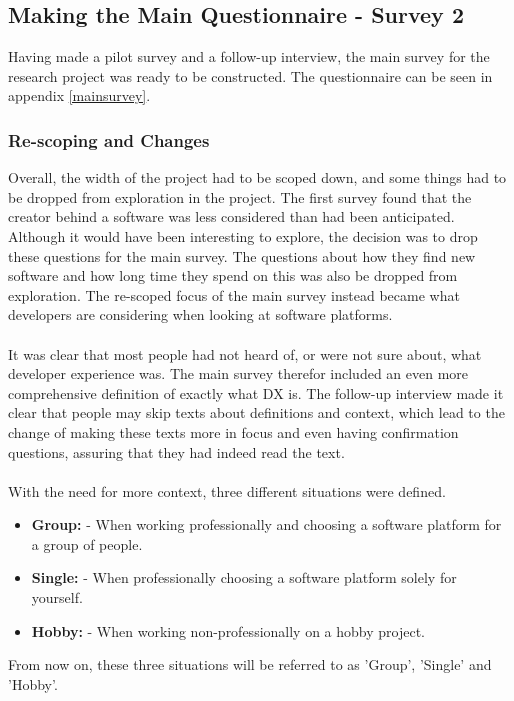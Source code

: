 \documentclass{cslthse-msc}
\begin{document}
    \subsection{Making the Main Questionnaire - Survey 2}

    Having made a pilot survey and a follow-up interview, the main survey for the research project was ready to be constructed.
    The questionnaire can be seen in appendix \ref{mainsurvey}.

    \subsubsection{Re-scoping and Changes}\label{sec:rescoping}
    Overall, the width of the project had to be scoped down, and some
    things had to be dropped from exploration in the project. The
    first survey found that the creator behind a software was less
    considered than had been anticipated. Although it would have been interesting to explore, the decision was to drop these questions for the main survey.
    The questions about how they find new software
    and how long time they spend on this was also be dropped from
    exploration. The re-scoped focus of the main survey instead became what developers are considering when looking at software platforms.
    \\ \\
    It was clear that most people had not heard of, or were not sure about,
    what developer experience was. The main survey therefor included an even more comprehensive definition of exactly what DX is.
    The follow-up interview made it clear that people may skip texts about definitions and context, which lead to the change of making these texts more in focus and even having confirmation questions, assuring that they had indeed read the text.
    \\ \\
    With the need for more context, three different situations were defined.
    \begin{itemize}[label={}]
        \item \textbf{Group:} - When working professionally and choosing a software platform for a group of people.
        \item \textbf{Single:} - When professionally choosing a software platform solely for yourself.
        \item \textbf{Hobby:} - When working non-professionally on a hobby project.
    \end{itemize}
    From now on, these three situations will be referred to as 'Group', 'Single' and 'Hobby'.
\end{document}
